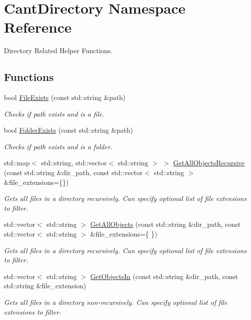 \hypertarget{namespaceCantDirectory}{}\section{Cant\+Directory Namespace Reference}
\label{namespaceCantDirectory}


Directory Related Helper Functions.  


\subsection*{Functions}
\begin{DoxyCompactItemize}
\item 
bool \hyperlink{namespaceCantDirectory_a767d0a23dd8fbbd289bf99fa9b2e6b2c}{File\+Exists} (const std\+::string \&path)
\begin{DoxyCompactList}\small\item\em Checks if path exists and is a file. \end{DoxyCompactList}\item 
bool \hyperlink{namespaceCantDirectory_a3fc8037d0d488b6ebd001aae47b474a8}{Folder\+Exists} (const std\+::string \&path)
\begin{DoxyCompactList}\small\item\em Checks if path exists and is a folder. \end{DoxyCompactList}\item 
std\+::map$<$ std\+::string, std\+::vector$<$ std\+::string $>$ $>$ \hyperlink{namespaceCantDirectory_a60226f9192495eadf59bb646d5df9322}{Get\+All\+Objects\+Recursive} (const std\+::string \&dir\+\_\+path, const std\+::vector$<$ std\+::string $>$ \&file\+\_\+extensions=\{\})
\begin{DoxyCompactList}\small\item\em Gets all files in a directory recursively. Can specify optional list of file extensions to filter. \end{DoxyCompactList}\item 
std\+::vector$<$ std\+::string $>$ \hyperlink{namespaceCantDirectory_a8a0cb619ba4ccb459785ea1394b63983}{Get\+All\+Objects} (const std\+::string \&dir\+\_\+path, const std\+::vector$<$ std\+::string $>$ \&file\+\_\+extensions=\{ \})
\begin{DoxyCompactList}\small\item\em Gets all files in a directory recursively. Can specify optional list of file extensions to filter. \end{DoxyCompactList}\item 
std\+::vector$<$ std\+::string $>$ \hyperlink{namespaceCantDirectory_a6b53cda775608f26f9798c40b81f13ef}{Get\+Objects\+In} (const std\+::string \&dir\+\_\+path, const std\+::string \&file\+\_\+extension)
\begin{DoxyCompactList}\small\item\em Gets all files in a directory non-\/recursively. Can specify optional list of file extensions to filter. \end{DoxyCompactList}\end{DoxyCompactItemize}


